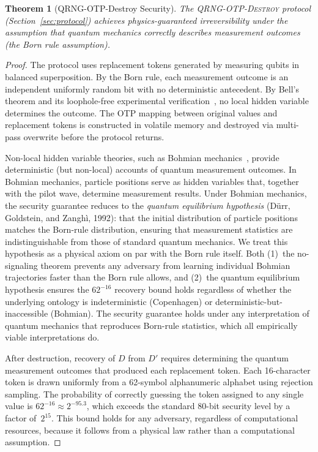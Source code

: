 \documentclass[journal]{IEEEtran}
\newtheorem{theorem}{Theorem}
\begin{document}
\begin{theorem}[QRNG-OTP-Destroy Security]
\label{thm:qrng_secure}
The \textsc{QRNG-OTP-Destroy} protocol (Section~\ref{sec:protocol}) achieves physics-guaranteed irreversibility under the assumption that quantum mechanics correctly describes measurement outcomes (the Born rule assumption).
\end{theorem}

\begin{proof}
The protocol uses replacement tokens generated by measuring qubits in balanced superposition. By the Born rule, each measurement outcome is an independent uniformly random bit with no deterministic antecedent. By Bell's theorem and its loophole-free experimental verification~\cite{hensen2015loophole}, no local hidden variable determines the outcome. The OTP mapping between original values and replacement tokens is constructed in volatile memory and destroyed via multi-pass overwrite before the protocol returns.

Non-local hidden variable theories, such as Bohmian mechanics~\cite{bohm1952suggested}, provide deterministic (but non-local) accounts of quantum measurement outcomes. In Bohmian mechanics, particle positions serve as hidden variables that, together with the pilot wave, determine measurement results. Under Bohmian mechanics, the security guarantee reduces to the \emph{quantum equilibrium hypothesis} (D\"urr, Goldstein, and Zangh\`{i}, 1992): that the initial distribution of particle positions matches the Born-rule distribution, ensuring that measurement statistics are indistinguishable from those of standard quantum mechanics. We treat this hypothesis as a physical axiom on par with the Born rule itself. Both (1)~the no-signaling theorem prevents any adversary from learning individual Bohmian trajectories faster than the Born rule allows, and (2)~the quantum equilibrium hypothesis ensures the $62^{-16}$ recovery bound holds regardless of whether the underlying ontology is indeterministic (Copenhagen) or deterministic-but-inaccessible (Bohmian). The security guarantee holds under any interpretation of quantum mechanics that reproduces Born-rule statistics, which all empirically viable interpretations do.

After destruction, recovery of $D$ from $D'$ requires determining the quantum measurement outcomes that produced each replacement token. Each 16-character token is drawn uniformly from a 62-symbol alphanumeric alphabet using rejection sampling. The probability of correctly guessing the token assigned to any single value is $62^{-16} \approx 2^{-95.3}$, which exceeds the standard 80-bit security level by a factor of~$2^{15}$. This bound holds for any adversary, regardless of computational resources, because it follows from a physical law rather than a computational assumption.


\end{proof}
\end{document}
